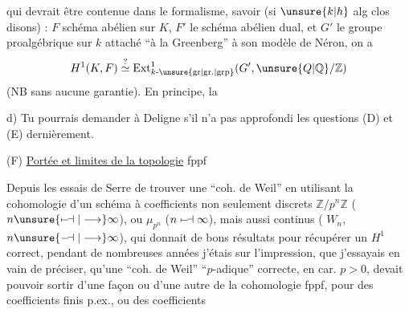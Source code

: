 qui devrait être contenue dans le formalisme, savoir (si $\unsure{k|h}$ alg clos disons) :  $F$ schéma abélien sur $K$, $F'$ le schéma abélien dual, et $G'$ le groupe proalgébrique sur $k$ attaché ``à la Greenberg'' à son modèle de Néron, on a
\[
 H^1(K,F)\overset{?}{\simeq}\operatorname{Ext}^{1}_{k\text{-}\unsure{\mathrm{gr}|\mathrm{gr.}|\mathrm{grp}}}(G',\unsure{Q|\mathbb Q}/\mathbb Z)
\]
(NB sans aucune garantie). En principe, la
{\reversemarginpar{}}

d) Tu pourrais demander à Deligne s'il n'a pas approfondi les questions (D) et (E) dernièrement.


(F) \uline{Portée et limites de la topologie} fppf

Depuis les essais de Serre de trouver une ``coh. de Weil'' en utilisant la cohomologie d'un schéma à coefficients non seulement discrets $\mathbb Z/p^n\mathbb Z$ ($n\unsure{\mapstochar\relbar\joinrel\dashv|\longrightarrow}\infty$), ou $\mu_{p^n}$ ($n\mathrel{\mapstochar\relbar\joinrel\dashv}\infty$), mais aussi continus ( $W_n$, $n\unsure{\relbar\joinrel\dashv|\longrightarrow}\infty$), qui donnait de bons résultats pour récupérer un $H^1$ correct, pendant de nombreuses années j'étais  sur l'impression, que j'essayais en vain de préciser, qu'une ``coh. de Weil'' ``$p$-adique''\unsure{:} correcte, en car. $p>0$, devait pouvoir sortir d'une façon ou d'une autre de la cohomologie fppf, pour des coefficients finis p.ex., ou des coefficients
